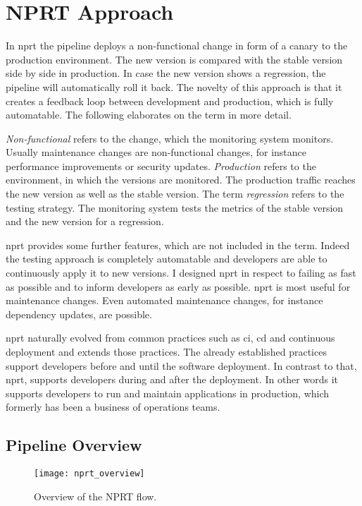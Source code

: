 \chapter{NPRT Approach}
\label{chap:macro}

In \gls{nprt} the pipeline deploys a non-functional change in form of a canary to the
production environment. The new version is compared with the stable version side by side
in production. In case the new version shows a regression, the pipeline will automatically
roll it back. The novelty of this approach is that it creates a feedback loop between
development and production, which is fully automatable. The following elaborates on the
term in more detail.

\emph{Non-functional} refers to the change, which the monitoring system monitors. Usually
maintenance changes are non-functional changes, for instance performance improvements or
security updates. \emph{Production} refers to the environment, in which the versions are
monitored. The production traffic reaches the new version as well as the stable
version. The term \emph{regression} refers to the testing strategy. The monitoring system
tests the metrics of the stable version and the new version for a regression.

\gls{nprt} provides some further features, which are not included in the term. Indeed the
testing approach is completely automatable and developers are able to continuously apply
it to new versions. I designed \gls{nprt} in respect to failing as fast as possible and to
inform developers as early as possible. \gls{nprt} is most useful for maintenance
changes. Even automated maintenance changes, for instance dependency updates, are
possible.

\gls{nprt} naturally evolved from common practices such as \gls{ci}, \gls{cd} and
continuous deployment and extends those practices. The already established practices
support developers before and until the software deployment. In contrast to that,
\gls{nprt}, supports developers during and after the deployment. In other words it
supports developers to run and maintain applications in production, which formerly has
been a business of operations teams.

\section{Pipeline Overview}

\begin{figure}[htbp]
  \texttt{[image: nprt\_overview]}
  \caption[nprtflow]{Overview of the NPRT flow.}
  \label{fig:nprt_flow}
\end{figure}

